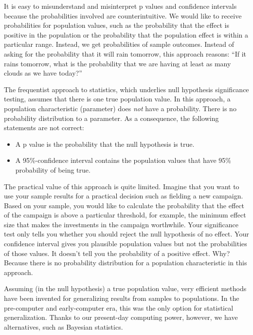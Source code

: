 \documentclass[doc]{apa6}
\providecommand{\tightlist}{%
  \setlength{\itemsep}{0pt}\setlength{\parskip}{0pt}}
\begin{document}
It is easy to misunderstand and misinterpret p values and confidence
intervals because the probabilities involved are counterintuitive. We
would like to receive probabilities for population values, such as the
probability that the effect is positive in the population or the
probability that the population effect is within a particular range.
Instead, we get probabilities of sample outcomes. Instead of asking for
the probability that it will rain tomorrow, this approach reasons:
\enquote{If it rains tomorrow, what is the probability that we are
having at least as many clouds as we have today?}

The frequentist approach to statistics, which underlies null hypothesis
significance testing, assumes that there is one true population value.
In this approach, a population characteristic (parameter) does
\emph{not} have a probability. There is no probability distribution to a
parameter. As a consequence, the following statements are not correct:

\begin{itemize}
\tightlist
\item
  A p value is the probability that the null hypothesis is true.
\item
  A 95\%-confidence interval contains the population values that have
  95\% probability of being true.
\end{itemize}

The practical value of this approach is quite limited. Imagine that you
want to use your sample results for a practical decision such as
fielding a new campaign. Based on your sample, you would like to
calculate the probability that the effect of the campaign is above a
particular threshold, for example, the minimum effect size that makes
the investments in the campaign worthwhile. Your significance test only
tells you whether you should reject the null hypothesis of no effect.
Your confidence interval gives you plausible population values but not
the probabilities of those values. It doesn't tell you the probability
of a positive effect. Why? Because there is no probability distribution
for a population characteristic in this approach.

Assuming (in the null hypothesis) a true population value, very
efficient methods have been invented for generalizing results from
samples to populations. In the pre-computer and early-computer era, this
was the only option for statistical generalization. Thanks to our
present-day computing power, however, we have alternatives, such as
Bayesian statistics.
\end{document}
